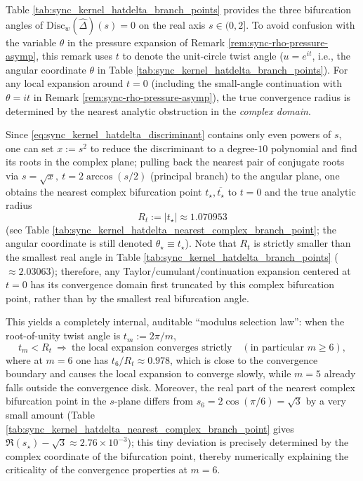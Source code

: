 \begin{remark}[True analytic radius: the nearest complex bifurcation point pins down the convergence disk at \texorpdfstring{$t=0$}{t=0}]\label{rem:sync-hatdelta-analytic-radius-complex}
Table \ref{tab:sync_kernel_hatdelta_branch_points} provides the three bifurcation angles of \(\mathrm{Disc}_w(\widehat\Delta)(s)=0\) on the real axis \(s\in(0,2]\).
To avoid confusion with the variable \(\theta\) in the pressure expansion of Remark \ref{rem:sync-rho-pressure-asymp}, this remark uses \(t\) to denote the unit-circle twist angle (\(u=e^{it}\), i.e., the angular coordinate \(\theta\) in Table \ref{tab:sync_kernel_hatdelta_branch_points}).
For any local expansion around \(t=0\) (including the small-angle continuation with \(\theta=it\) in Remark \ref{rem:sync-rho-pressure-asymp}), the true convergence radius is determined by the nearest analytic obstruction in the \emph{complex domain}.
\par
Since \eqref{eq:sync_kernel_hatdelta_discriminant} contains only even powers of \(s\), one can set \(x:=s^2\) to reduce the discriminant to a degree-\(10\) polynomial and find its roots in the complex plane; pulling back the nearest pair of conjugate roots via
\(
s=\sqrt{x},\
t=2\arccos(s/2)
\)
(principal branch) to the angular plane, one obtains the nearest complex bifurcation point \(t_\star,\overline{t_\star}\) to \(t=0\) and the true analytic radius
\[
\boxed{\;R_t:=|t_\star|\approx 1.070953\;}
\]
(see Table \ref{tab:sync_kernel_hatdelta_nearest_complex_branch_point}; the angular coordinate is still denoted \(\theta_\star\equiv t_\star\)).
Note that \(R_t\) is strictly smaller than the smallest real angle in Table \ref{tab:sync_kernel_hatdelta_branch_points} (\(\approx 2.03063\)); therefore, any Taylor/cumulant/continuation expansion centered at \(t=0\) has its convergence domain first truncated by this complex bifurcation point, rather than by the smallest real bifurcation angle.
\par
This yields a completely internal, auditable ``modulus selection law'': when the root-of-unity twist angle is \(t_m:=2\pi/m\),
\[
t_m<R_t\ \Longrightarrow\ \text{the local expansion converges strictly}\quad(\text{in particular }m\ge 6),
\]
where at \(m=6\) one has \(t_6/R_t\approx 0.978\), which is close to the convergence boundary and causes the local expansion to converge slowly, while \(m=5\) already falls outside the convergence disk.
Moreover, the real part of the nearest complex bifurcation point in the \(s\)-plane differs from \(s_6=2\cos(\pi/6)=\sqrt3\) by a very small amount (Table \ref{tab:sync_kernel_hatdelta_nearest_complex_branch_point} gives \(\Re(s_\star)-\sqrt3\approx 2.76\times 10^{-3}\)); this tiny deviation is precisely determined by the complex coordinate of the bifurcation point, thereby numerically explaining the criticality of the convergence properties at \(m=6\).

\end{remark}
